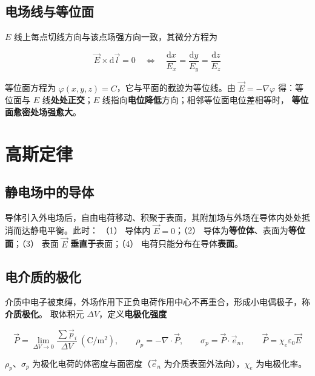 \subsection{电场线与等位面}

$E$ 线上每点切线方向与该点场强方向一致，其微分方程为
\begin{formulaBox}
\[
\vec{E}\times\mathrm{d}\vec{l}=0
\quad\Longleftrightarrow\quad
\frac{\mathrm{d}x}{E_x}=\frac{\mathrm{d}y}{E_y}=\frac{\mathrm{d}z}{E_z}
\]
\end{formulaBox}

等位面方程为 $\varphi(x,y,z)=C$，它与平面的截迹为等位线。由 $\vec{E}=-\nabla\varphi$ 得：等位面与
$E$ 线\textbf{处处正交}；$E$ 线指向\textbf{电位降低}方向；相邻等位面电位差相等时，
\textbf{等位面愈密处场强愈大}。


\section{高斯定律}

\subsection{静电场中的导体}

导体引入外电场后，自由电荷移动、积聚于表面，其附加场与外场在导体内处处抵消而达静电平衡。此时：
（1） 导体内 $\vec{E}=0$；（2） 导体为\textbf{等位体}、表面为\textbf{等位面}；（3） 表面 $\vec{E}$
\textbf{垂直于}表面；（4） 电荷只能分布在导体\textbf{表面}。

\subsection{电介质的极化}

介质中电子被束缚，外场作用下正负电荷作用中心不再重合，形成小电偶极子，称\textbf{介质极化}。
取体积元 $\Delta V$，定义\textbf{电极化强度}
\begin{formulaBox}
\[
\vec{P}=\lim_{\Delta V\to0}\frac{\sum\vec{p}_i}{\Delta V}\ (\mathrm{C/m^2}),
\qquad
\rho_p=-\nabla\cdot\vec{P},
\qquad
\sigma_p=\vec{P}\cdot\vec{e}_n,
\qquad
\vec{P}=\chi_e\varepsilon_0\vec{E}
\]
\end{formulaBox}

$\rho_p$、$\sigma_p$ 为极化电荷的体密度与面密度（$\vec{e}_n$ 为介质表面外法向），$\chi_e$ 为电极化率。

